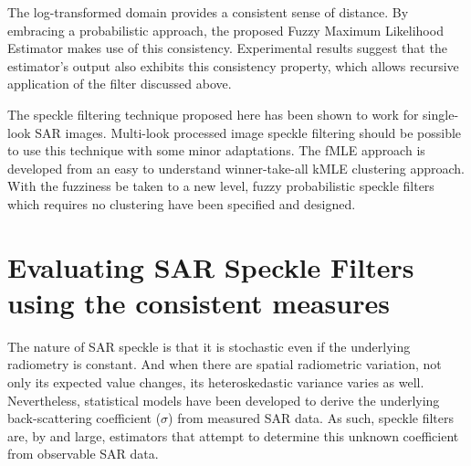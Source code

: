 The log-transformed domain provides a consistent sense of distance. By embracing
a probabilistic approach, the proposed Fuzzy Maximum Likelihood Estimator makes
use of this consistency. Experimental results suggest that the estimator’s output also
exhibits this consistency property, which allows recursive application of the filter discussed above. 

The speckle filtering technique proposed here has been shown to work for single-look SAR images. 
Multi-look processed image speckle filtering should be possible to use this technique with some minor adaptations. 
The fMLE approach is developed from an easy to understand winner-take-all kMLE clustering approach. %
With the fuzziness be taken to a new level, fuzzy probabilistic speckle filters which requires no clustering have been specified and designed.

%

\section{Evaluating SAR Speckle Filters using the consistent measures}

The nature of SAR speckle is that
	it is stochastic even if the underlying radiometry is constant. 
And when there are spatial radiometric variation, not only its expected value changes, its heteroskedastic variance varies as well.
Nevertheless, statistical models have been developed to derive the underlying back-scattering coefficient ($\sigma$) from measured SAR data. 
As such, speckle filters are, by and large, estimators that attempt to determine this unknown coefficient from observable SAR data. 

